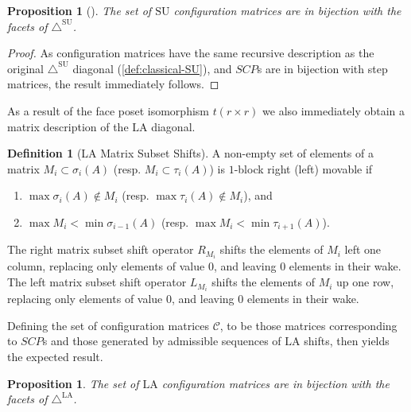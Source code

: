 \documentclass{amsart}
\newtheorem{proposition}[theorem]{Proposition}
\theoremstyle{definition}
\newtheorem{definition}[theorem]{Definition}
\newcommand{\SU}{\mathrm{SU}}
\newcommand{\LA}{\mathrm{LA}}
\newcommand{\SUD}{\triangle^{\mathrm{SU}}}
\newcommand{\LAD}{\triangle^{\mathrm{LA}}}
\begin{document}
\begin{proposition}[\cite{SaneblidzeUmble04}]
The set of $\SU$ configuration matrices are in bijection with the facets of $\SUD$.
\end{proposition}
\begin{proof}
As configuration matrices have the same recursive description as the original $\SUD$ diagonal (\cref{def:classical-SU}), and $SCP$s are in bijection with step matrices, the result immediately follows.
\end{proof}

As a result of the face poset isomorphism $t(r\times r)$ we also immediately obtain a matrix description of the $\LA$ diagonal.
\begin{definition}[LA Matrix Subset Shifts]
A non-empty set of elements of a matrix $M_i \subset \sigma_i(A)$ (resp. $M_{i}\subset \tau_{i}(A)$) is $1$-block right (left) movable if
\begin{enumerate}
    \item $\max \sigma_i(A) \notin M_i$ (resp. $\max \tau_{i}(A) \notin M_i$), and
    \item $\max M_i < \min \sigma_{i-1}(A)$ (resp. $\max M_{i} < \min \tau_{i+1}(A)$).
\end{enumerate}
The right matrix subset shift operator $R_{M_i}$ shifts the elements of $M_i$ left one column, replacing only elements of value $0$, and leaving $0$ elements in their wake.
The left matrix subset shift operator $L_{M_i}$ shifts the elements of $M_i$ up one row, replacing only elements of value $0$, and leaving $0$ elements in their wake.
\end{definition}
Defining the set of configuration matrices $\mathcal{C}$, to be those matrices  corresponding to $SCP$s and those generated by admissible sequences of $\LA$ shifts, then yields the expected result.
\begin{proposition}
The set of $\LA$ configuration matrices are in bijection with the facets of $\LAD$.
\end{proposition}
\end{document}
